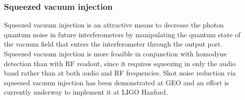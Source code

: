 \subsubsection*{Squeezed vacuum injection} 
Squeezed vacuum injection is an attractive means to decrease the
photon quantum noise in future interferometers by manipulating the
quantum state of the vacuum field that enters the interferometer
through the output port.  Squeezed vacuum injection is more feasible
in conjunction with homodyne detection than with RF readout, since it
requires squeezing in only the audio band rather than at both audio
and RF frequencies\cite{GeaBanacloche1987Squeezed,
  Chelkowski2007Coherent}.  Shot noise reduction via squeezed vacuum
injection has been demonstrated at GEO\cite{GeoSqueezingNature2011}
and an effort is currently underway to implement it at LIGO
Hanford\cite{H1SqueezerProposal}.

